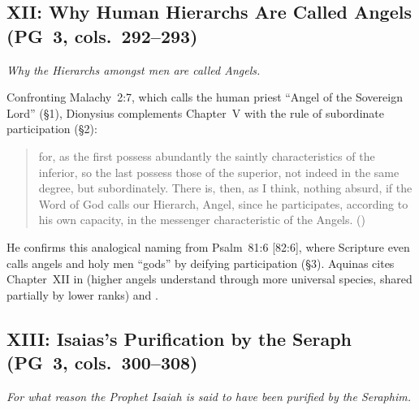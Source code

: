 \subsection{XII: Why Human Hierarchs Are Called Angels (PG~3, cols.~292--293)}
\label{sec:ch-xii}
\emph{Why the Hierarchs amongst men are called Angels.}

Confronting Malachy~2:7, which calls the human priest ``Angel of the Sovereign Lord'' (\S 1), Dionysius complements Chapter~V with the rule of subordinate participation (\S 2):
\begin{quotation}
for, as the first possess abundantly the saintly characteristics of the inferior, so the last possess those of the superior, not indeed in the same degree, but subordinately. There is, then, as I think, nothing absurd, if the Word of God calls our Hierarch, Angel, since he participates, according to his own capacity, in the messenger characteristic of the Angels. ()
\end{quotation}
He confirms this analogical naming from Psalm~81:6 [82:6], where Scripture even calls angels and holy men ``gods'' by deifying participation (\S 3). Aquinas cites Chapter~XII in  (higher angels understand through more universal species, shared partially by lower ranks) and .

\subsection{XIII: Isaias's Purification by the Seraph (PG~3, cols.~300--308)}
\label{sec:ch-xiii}
\emph{For what reason the Prophet Isaiah is said to have been purified by the Seraphim.}

